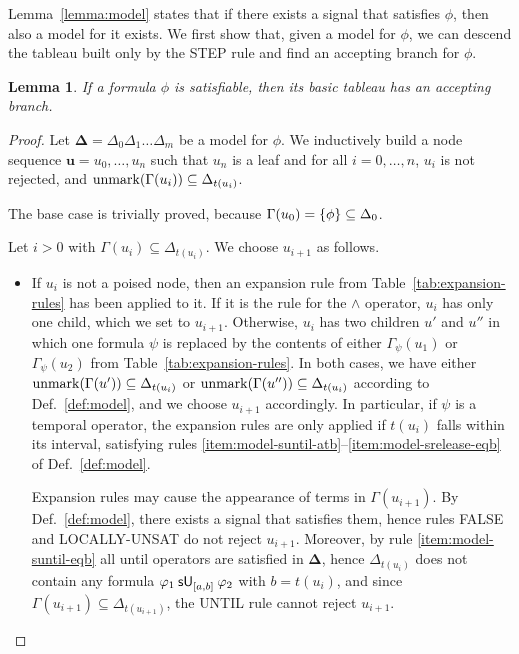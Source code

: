 \documentclass[acmsmall,screen]{acmart}
\newtheorem{lemma}{Lemma}
\begin{document}
Lemma~\ref{lemma:model} states that if there exists a signal that satisfies $\phi$,
then also a model for it exists.
We first show that, given a model for $\phi$,
we can descend the tableau built only by the \textsf{STEP} rule and find an accepting branch for $\phi$.
\begin{lemma}
\label{lemma:step-complete}
If a formula $\phi$ is satisfiable, then its basic tableau has an accepting branch.
\end{lemma}
\begin{proof}
Let $\mathbf{\Delta} = \Delta_0 \Delta_1 \dots \Delta_m$ be a model for $\phi$.
We inductively build a node sequence $\mathbf{u} = u_0, \dots, u_n$ such that $u_n$ is a leaf
and for all $i = 0, \dots, n$, $u_i$ is not rejected, and $\unmark(\Gamma(u_i)) \subseteq \Delta_{t(u_i)}$.

The base case is trivially proved, because $\Gamma(u_0) = \set{\phi} \subseteq \Delta_0$.

Let $i > 0$ with $\Gamma(u_i) \subseteq \Delta_{t(u_i)}$.
We choose $u_{i+1}$ as follows.
\begin{itemize}
\item If $u_i$ is not a poised node, then an expansion rule from Table~\ref{tab:expansion-rules} has been applied to it.
    If it is the rule for the $\land$ operator, $u_i$ has only one child, which we set to $u_{i+1}$.
    Otherwise, $u_i$ has two children $u'$ and $u''$ in which one formula $\psi$ is replaced by
    the contents of either $\Gamma_\psi(u_1)$ or $\Gamma_\psi(u_2)$ from Table~\ref{tab:expansion-rules}.
    In both cases, we have either $\unmark(\Gamma(u')) \subseteq \Delta_{t(u_i)}$ or $\unmark(\Gamma(u'')) \subseteq \Delta_{t(u_i)}$
    according to Def.~\ref{def:model}, and we choose $u_{i+1}$ accordingly.
    In particular, if $\psi$ is a temporal operator, the expansion rules are only applied if
    $t(u_i)$ falls within its interval, satisfying rules \ref{item:model-suntil-atb}--\ref{item:model-srelease-eqb}
    of Def.~\ref{def:model}.

    Expansion rules may cause the appearance of terms in $\Gamma(u_{i+1})$.
    By Def.~\ref{def:model}, there exists a signal that satisfies them,
    hence rules \textsf{FALSE} and \textsf{LOCALLY-UNSAT} do not reject $u_{i+1}$.
    Moreover, by rule \ref{item:model-suntil-eqb} all until operators are satisfied in $\mathbf{\Delta}$,
    hence $\Delta_{t(u_i)}$ does not contain any formula $\suntil{[a,b]}{\varphi_1}{\varphi_2}$ with $b = t(u_i)$,
    and since $\Gamma(u_{i+1}) \subseteq \Delta_{t(u_{i+1})}$, the \textsf{UNTIL} rule cannot reject $u_{i+1}$.


\end{itemize}
\end{proof}
\end{document}
